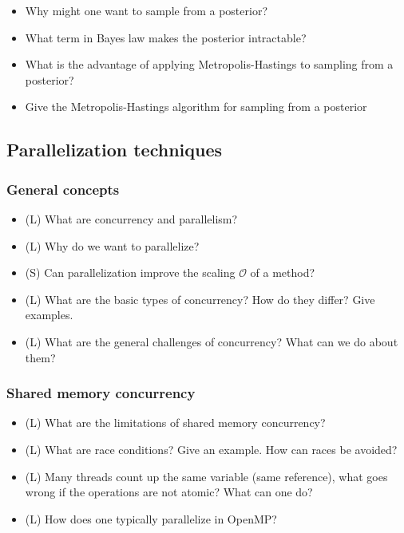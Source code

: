 \begin{itemize}
    \item Why might one want to sample from a posterior?
    \answerboxM
    \item What term in Bayes law makes the posterior intractable?
    \answerboxM
    \item What is the advantage of applying Metropolis-Hastings to sampling from a posterior?
    \answerboxM
    \item Give the Metropolis-Hastings algorithm for sampling from a posterior
    \answerboxL
\end{itemize}

\subsection*{Parallelization techniques}

\subsubsection*{General concepts}
\begin{itemize}
    \item (L) What are concurrency and parallelism?
    \answerboxS
    \item (L) Why do we want to parallelize?
    \answerboxS
    \item (S) Can parallelization improve the scaling $\mathcal{O}$ of a method?
    \answerboxS
    \item (L) What are the basic types of concurrency? How do they differ? Give examples.
    \answerboxS
    \item (L) What are the general challenges of concurrency? What can we do about them?
    \answerboxM
\end{itemize}

\subsubsection*{Shared memory concurrency}
\begin{itemize}
    \item (L) What are the limitations of shared memory concurrency?
    \answerboxS
    \item (L) What are race conditions? Give an example. How can races be avoided?
    \answerboxM
    \item (L) Many threads count up the same variable (same reference), what goes wrong if the operations are not atomic? What can one do?
    \answerboxS
    \item (L) How does one typically parallelize in OpenMP?
    \answerboxM
\end{itemize}

